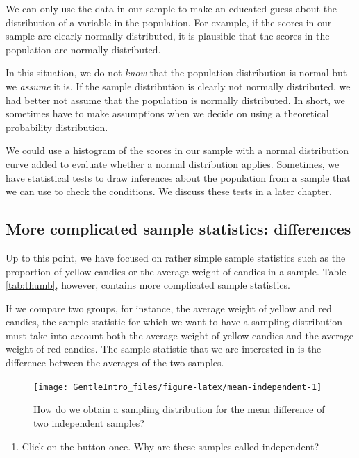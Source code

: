 \documentclass[a4paper]{book}
\providecommand{\tightlist}{%
  \setlength{\itemsep}{0pt}\setlength{\parskip}{0pt}}
\theoremstyle{definition}
\theoremstyle{definition}
\theoremstyle{definition}
\theoremstyle{remark}
\begin{document}
We can only use the data in our sample to make an educated guess about
the distribution of a variable in the population. For example, if the
scores in our sample are clearly normally distributed, it is plausible
that the scores in the population are normally distributed.

In this situation, we do not \emph{know} that the population
distribution is normal but we \emph{assume} it is. If the sample
distribution is clearly not normally distributed, we had better not
assume that the population is normally distributed. In short, we
sometimes have to make assumptions when we decide on using a theoretical
probability distribution.

We could use a histogram of the scores in our sample with a normal
distribution curve added to evaluate whether a normal distribution
applies. Sometimes, we have statistical tests to draw inferences about
the population from a sample that we can use to check the conditions. We
discuss these tests in a later chapter.

\subsection{More complicated sample statistics:
differences}\label{complicatedsampling}

Up to this point, we have focused on rather simple sample statistics
such as the proportion of yellow candies or the average weight of
candies in a sample. Table \ref{tab:thumb}, however, contains more
complicated sample statistics.

If we compare two groups, for instance, the average weight of yellow and
red candies, the sample statistic for which we want to have a sampling
distribution must take into account both the average weight of yellow
candies and the average weight of red candies. The sample statistic that
we are interested in is the difference between the averages of the two
samples.

\begin{figure}[H]
\href{http://82.196.4.233:3838/apps/mean-independent/}{\texttt{[image: GentleIntro\_files/figure-latex/mean-independent-1]} }\caption{How do we obtain a sampling distribution for the mean difference of two independent samples?}\label{fig:mean-independent}
\end{figure}

\begin{enumerate}
\def\labelenumi{\arabic{enumi}.}
\tightlist
\item
  Click on the button once. Why are these samples called independent?
\end{enumerate}
\end{document}
